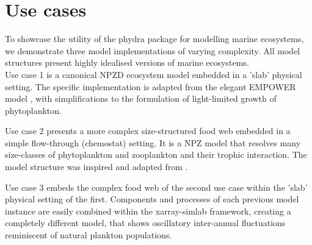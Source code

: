 \documentclass[template.tex]{subfiles}
\begin{document}
\section{Use cases}

To showcase the utility of the phydra package for modelling marine ecosystems, we demonstrate three model implementations of varying complexity.
All model structures present highly idealised versions of marine ecosystems.\\

Use case 1 is a canonical NPZD ecosystem model embedded in a 'slab' physical setting. The specific implementation is adapted from the elegant EMPOWER model \citep{Anderson2015c}, with simplifications to the formulation of light-limited growth of phytoplankton.

Use case 2 presents a more complex size-structured food web embedded in a simple flow-through (chemostat) setting. It is a NPZ model that resolves many size-classes of phytoplankton and zooplankton and their trophic interaction. The model structure was inspired and adapted from \citet{Banas2011b}. 

Use case 3 embeds the complex food web of the second use case within the 'slab' physical setting of the first. Components and processes of each previous model instance are easily combined within the xarray-simlab framework, creating a completely different model, that shows oscillatory inter-annual fluctuations reminiscent of natural plankton populations. \\
\end{document}
